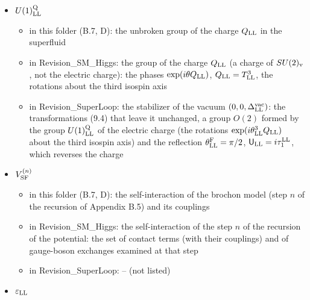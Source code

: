 \documentclass[
  10pt,
]{article}
\providecommand{\tightlist}{%
  \setlength{\itemsep}{0pt}\setlength{\parskip}{0pt}}
\begin{document}
\begin{itemize}
  \begin{itemize}
  \tightlist
  \item
    in this folder (B.7): the isospin rotations, the phases of the
    fermion number, and the gauge group (B.3)
  \item
    in Revision\_SM\_Higgs: the isospin group, which acts on the isospin
    index of the spinor field (and on isospin vectors by rotations), and
    the group of the phases of the fermion number,
    \(\Psi_{\rm LL}\mapsto e^{i\theta^{\rm F}_{\rm LL}}\Psi_{\rm LL}\);
    \(F_{\rm LL}\) is its generator, the fermion number (1 on
    \(\Psi_{\rm LL}\), 2 on a pair of two spinor charges); the author
    writes \(U(1)^{\rm F}_{\rm LL}\) as U(1)FLL
  \item
    in Revision\_SuperLoop: the generator of the fermion number
    \(\Psi_{\rm LL}\to e^{i\theta_{\rm LL}}\Psi_{\rm LL}\) (it
    multiplies \(\vec d_{\rm LL}\) by \(2i\)) and its group; the isospin
    group, which rotates the isospin index of \(\Psi_{\rm LL}\) and
    \(\vec d_{\rm LL}\) as a vector
  \end{itemize}
\item
  \(U(1)^{\rm Q}_{\rm LL}\)

  \begin{itemize}
  \tightlist
  \item
    in this folder (B.7, D): the unbroken group of the charge
    \(Q_{\rm LL}\) in the superfluid
  \item
    in Revision\_SM\_Higgs: the group of the charge \(Q_{\rm LL}\) (a
    charge of \(SU(2)_{\rm v}\), not the electric charge): the phases
    \(\exp(i\theta Q_{\rm LL})\), \(Q_{\rm LL}=T^3_{\rm LL}\), the
    rotations about the third isospin axis
  \item
    in Revision\_SuperLoop: the stabilizer of the vacuum
    \((0,0,\Delta^{\rm vac}_{\rm LL})\): the transformations (9.4) that
    leave it unchanged, a group \(O(2)\) formed by the group
    \(U(1)^{\rm Q}_{\rm LL}\) of the electric charge (the rotations
    \(\exp(i\theta^3_{\rm LL}Q_{\rm LL})\) about the third isospin axis)
    and the reflection \(\theta^{\rm F}_{\rm LL}=\pi/2\),
    \(\mathsf U_{\rm LL}=i\tau^{\rm LL}_1\), which reverses the charge
  \end{itemize}
\item
  \(V^{(n)}_{\rm SF}\)

  \begin{itemize}
  \tightlist
  \item
    in this folder (B.7, D): the self-interaction of the brochon model
    (step \(n\) of the recursion of Appendix B.5) and its couplings
  \item
    in Revision\_SM\_Higgs: the self-interaction of the step \(n\) of
    the recursion of the potential: the set of contact terms (with their
    couplings) and of gauge-boson exchanges examined at that step
  \item
    in Revision\_SuperLoop: -- (not listed)
  \end{itemize}
\item
  \(\varepsilon_{\rm LL}\)


\end{itemize}
\end{document}
